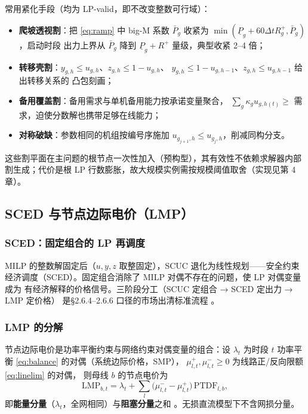 常用紧化手段（均为 LP-valid，即不改变整数可行域）：
\begin{itemize}
  \item \textbf{爬坡透视割}：把 \eqref{eq:ramp} 中 big-M 系数 $\bar P_g$
        收紧为 $\min(\underline P_g+60\Delta t R^+_g,\bar P_g)$，启动时段
        出力上界从 $\bar P_g$ 降到 $\underline P_g+R^+$ 量级，典型收紧
        2--4 倍；
  \item \textbf{转移壳割}：$y_{g,h}\le u_{g,h}$、$z_{g,h}\le 1-u_{g,h}$、
        $y_{g,h}\le 1-u_{g,h-1}$、$z_{g,h}\le u_{g,h-1}$ 给出转移关系的
        凸包刻画；
  \item \textbf{备用覆盖割}：备用需求与单机备用能力按承诺变量聚合，
        $\sum_g \kappa_g u_{g,h(t)}\ge$ 需求，迫使分数解也携带足够在线能力；
  \item \textbf{对称破缺}：参数相同的机组按编号序施加 $u_{g_{j+1},h}\le
        u_{g_j,h}$，削减同构分支。
\end{itemize}

这些割平面在主问题的根节点一次性加入（预构型），其有效性不依赖求解器内部
割生成；代价是根 LP 行数膨胀，故大规模实例需按规模阈值取舍（实现见第 4 章）。

\subsection{SCED 与节点边际电价（LMP）}

\subsubsection{SCED：固定组合的 LP 再调度}

MILP 的整数解固定后（$u,y,z$ 取整固定），SCUC 退化为线性规划——安全约束
经济调度（SCED）。固定组合消除了 MILP 对偶不存在的问题，使 LP 对偶变量成为
有经济解释的价格信号。三阶段分工（SCUC 定组合 → SCED 定出力 → LMP 定价格）
是§2.6.4--2.6.6 口径的市场出清标准流程 \cite{southern2025}。

\subsubsection{LMP 的分解}

\begin{definition}[LMP]
节点边际电价是功率平衡约束与网络约束对偶变量的组合：设 $\lambda_t$ 为时段
$t$ 功率平衡 \eqref{eq:balance} 的对偶（系统边际价格，SMP），
$\mu^+_{l,t},\mu^-_{l,t}\ge 0$ 为线路正/反向限额 \eqref{eq:linelim} 的对偶，
则母线 $b$ 的节点电价为
\begin{equation}
\mathrm{LMP}_{b,t}=\lambda_t+\sum_{l}\big(\mu^-_{l,t}-\mu^+_{l,t}\big)
\,\mathrm{PTDF}_{l,b},
\label{eq:lmp}
\end{equation}
即\textbf{能量分量}（$\lambda_t$，全网相同）与\textbf{阻塞分量}之和
\cite{schweppe1988,hogan1992}。无损直流模型下不含网损分量。
\end{definition}

